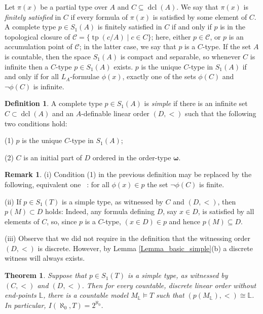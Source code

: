\documentclass[10pt,a4paper]{amsart}
\newtheorem{Theorem1}{Theorem}
\theoremstyle{definition}
\newtheorem{Definition}[Theorem]{Definition}
\newtheorem{Remark}[Theorem]{Remark}
\DeclareMathOperator{\dcl}{dcl}
\DeclareMathOperator{\tp}{tp}
\begin{document}
Let  $\pi(x)$ be a partial type over $A$  and  $C\subseteq \dcl(A)$. We say that $\pi(x)$ is {\it finitely satisfied} in $C$ if every  formula of $\pi(x)$ is satisfied by some element of $C$. A complete type $p\in S_1(A)$ is finitely satisfied in $C$ if and only if $p$ is in the topological closure of $\mathcal C=\{\tp(c/A)\mid c\in C\}$; here, either  $p\in\mathcal C$, or $p$ is an accumulation point of $\mathcal C$; in the latter case,   we say that $p$ is a $C$-type. If the set $A$ is countable, then the space $S_1(A)$ is compact and separable, so whenever $C$ is infinite then a $C$-type $p\in S_1(A)$ exists. $p$ is the unique $C$-type in $S_1(A)$ if and only if for all $L_A$-formulae $\phi(x)$, exactly one of the sets $\phi(C)$ and $\lnot\phi(C)$ is infinite. 

\begin{Definition}\label{Definition_simple}
A complete type $p\in S_1(A)$ is {\it simple} if there is an infinite set $C\subset\dcl(A)$ and an $A$-definable linear order $(D,<)$ such that the following two conditions hold:

(1) $p$ is the unique $C$-type in $S_1(A)$;

(2) $C$ is an initial part of $D$ ordered in the order-type $\boldsymbol{\omega}$.
\end{Definition}

\begin{Remark}
(i) Condition (1) in the previous definition may be replaced by the following, equivalent one \ : 
  for all $\phi(x)\in p$ the set $\lnot \phi(C)$ is finite. 

\smallskip
(ii)  If $p\in S_1(T)$ is a simple type, as witnessed by $C$ and $(D,<)$, then $p(M)\subset D$ holds: Indeed, any formula defining $D$, say $x\in D$, is satisfied by all elements of $C$, so, since $p$ is a $C$-type, $(x\in D)\in p$ and hence $p(M)\subseteq D$. 

\smallskip (iii) Observe that we did  not require in the definition that the witnessing order $(D,<)$ is discrete.  However, by Lemma \ref{Lemma_basic_simple}(b)  a discrete witness will always exists. 
\end{Remark}


\begin{Theorem1}
Suppose that $p\in S_1(T)$ is a simple type, as witnessed by $(C,<)$ and $(D,<)$. Then for every countable, discrete linear order without end-points $\mathbb L$, there is a countable model $M_{\mathbb L}\models T$ such that $(p(M_{\mathbb L}),<)\cong \mathbb L$. In particular,   $I(\aleph_0,T)=2^{\aleph_0}$. 
\end{Theorem1}
\end{document}
